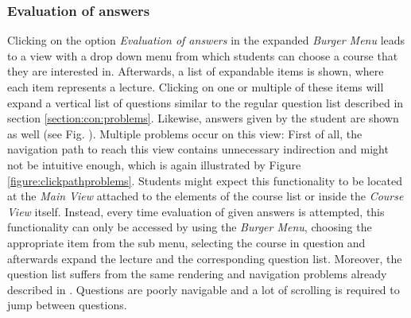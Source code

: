 \subsubsection{Evaluation of answers}

Clicking on the option \emph{Evaluation of answers} in the expanded \emph{Burger Menu} leads to a view with a drop down menu from which students can choose a course that they are interested in. Afterwards, a list of expandable items is shown, where each item represents a lecture. Clicking on one or multiple of these items will expand a vertical list of questions similar to  the regular question list described in section \ref{section:con:problems}. Likewise, answers given by the student are shown as well (see Fig. \todogrf).
Multiple problems occur on this view: First of all, the navigation path to reach this view contains unnecessary indirection and might not be intuitive enough, which is again illustrated by Figure \ref{figure:clickpathproblems}. Students might expect this functionality to be located at the \emph{Main View} attached to the elements of the course list or inside the \emph{Course View} itself. Instead, every time evaluation of given answers is attempted, this functionality can only be accessed by using the \emph{Burger Menu}, choosing the appropriate item from the sub menu, selecting the course in question and afterwards expand the lecture and the corresponding question list.
Moreover, the question list suffers from the same rendering and navigation problems already described in \todosct. Questions are poorly navigable and a lot of scrolling is required to jump between questions.



